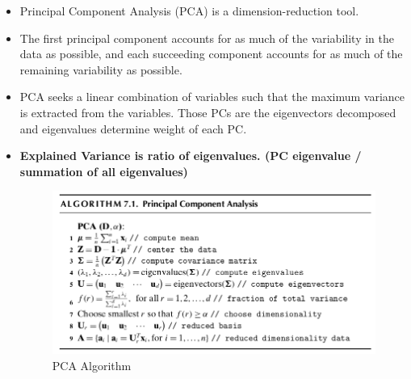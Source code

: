 \begin{itemize}
    \item Principal Component Analysis (PCA) is a dimension-reduction tool.
    \item The first principal component accounts for as much of the variability in the data as possible, and each succeeding component accounts for as much of the remaining variability as possible.
    \item PCA seeks a linear combination of variables such that the maximum variance is extracted from the variables.
    Those PCs are the eigenvectors decomposed and eigenvalues determine weight of each PC.
    \item \textbf{Explained Variance is ratio of eigenvalues. (PC eigenvalue / summation of all eigenvalues)}
    \begin{figure}[H]
        \includegraphics[width=\textwidth]{Figures/pca.png}
        \caption{\label{fig:figure1}PCA Algorithm}
    \end{figure}
\end{itemize}